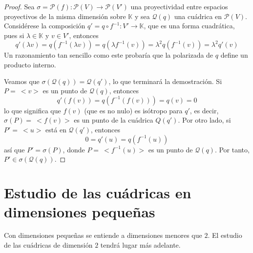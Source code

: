 \documentclass[12pt]{report}
\theoremstyle{definition}
\theoremstyle{definition}
\theoremstyle{remark}
\begin{document}
\begin{proof}
Sea $\sigma = \mathcal{P}(f) \colon \mathcal{P}(V) \to \mathcal{P}(V')$ una proyectividad entre espacios proyectivos de la misma dimensión sobre $\mathbb{K}$ y sea $\mathcal{Q}(q)$ una cuádrica en $\mathcal{P}(V)$. Considérese la composición $q' = q \circ f^{-1} \colon V' \to \mathbb{K}$, que es una forma cuadrática, pues si $\lambda \in \mathbb{K}$ y $v \in V'$, entonces
\[q'(\lambda v) = q(f^{-1}(\lambda v)) = q(\lambda f^{-1}(v)) = \lambda^2 q(f^{-1}(v)) = \lambda^2 q'(v)\]
Un razonamiento tan sencillo como este probaría que la polarizada de $q$ define un producto interno.

\vspace{2mm}
Veamos que $\sigma(\mathcal{Q}(q)) = \mathcal{Q}(q')$, lo que terminará la demostración. Si $P = \ < v>$ es un punto de $\mathcal{Q}(q)$, entonces
\[q'(f(v)) = q(f^{-1}(f(v))) = q(v) = 0\]
lo que significa que $f(v)$ (que es no nulo) es isótropo para $q'$, es decir, $\sigma(P) = \ < f(v)>$ es un punto de la cuádrica $Q(q')$. Por otro lado, si $P' = \ < u >$ está en $\mathcal{Q}(q')$, entonces
\[0 = q'(u) = q(f^{-1}(u))\]
así que $P' = \sigma(P)$, donde $P = \ < f^{-1}(u) >$ es un punto de $\mathcal{Q}(q)$. Por tanto, $P' \in \sigma(\mathcal{Q}(q))$.
\end{proof}

\section{Estudio de las cuádricas en dimensiones pequeñas}

Con dimensiones pequeñas se entiende a dimensiones menores que $2$. El estudio de las cuádricas de dimensión $2$ tendrá lugar más adelante.
\end{document}
